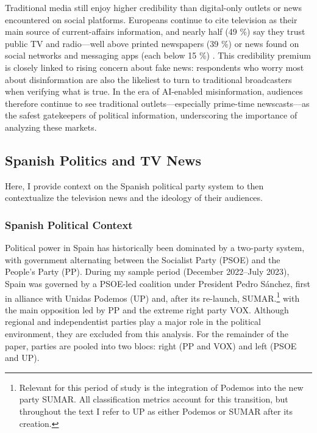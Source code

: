 \documentclass[12pt]{article}
\begin{document}
	
	

	
	
Traditional media still enjoy higher credibility than digital-only outlets or news encountered on social platforms. Europeans continue to cite television as their main source of current-affairs information, and nearly half (49 \%) say they trust public TV and radio—well above printed newspapers (39 \%) or news found on social networks and messaging apps (each below 15 \%) \citep{eurobarometer2022}. This credibility premium is closely linked to rising concern about fake news: respondents who worry most about disinformation are also the likeliest to turn to traditional broadcasters when verifying what is true. In the era of AI-enabled misinformation, audiences therefore continue to see traditional outlets—especially prime-time newscasts—as the safest gatekeepers of political information, underscoring the importance of analyzing these markets. 
	
	
	
	
	
	
	\subsection{Spanish Politics and TV News}
	
	
	
Here, I provide context on the Spanish political party system to then contextualize the television news and the ideology of their audiences.

	
	
	
	\subsubsection*{Spanish Political Context}
	

	

	
	
	Political power in Spain has historically been dominated by a two-party system, with government alternating between the Socialist Party (PSOE) and the People’s Party (PP). During my sample period (December 2022–July 2023), Spain was governed by a PSOE-led coalition under President Pedro Sánchez, first in alliance with Unidas Podemos (UP) and, after its re-launch, SUMAR.\footnote{Relevant for this period of study is the integration of Podemos into the new party SUMAR. All classification metrics account for this transition, but throughout the text I refer to UP as either Podemos or SUMAR after its creation.} with the main opposition led by PP and the extreme right party VOX. Although regional and independentist parties play a major role in the political environment, they are excluded from this analysis. For the remainder of the paper, parties are pooled into two blocs: right (PP and VOX) and left (PSOE and UP).
	
\end{document}
